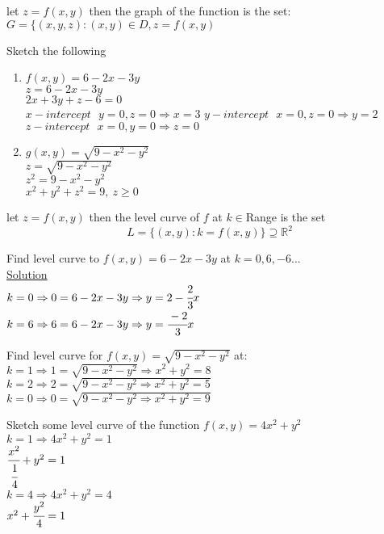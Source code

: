 \begin{definition}
let $z=f(x,y)$ then the graph of the function is the set:\\
$G=\{(x,y,z):(x,y)\in D,z=f(x,y)$
\end{definition}
\begin{example}
Sketch the following 
\begin{enumerate}
    \item $f(x,y)=6-2x-3y$\\
    $z=6-2x-3y$\\
    $2x+3y+z-6=0$\\
    $x-intercept~~~y=0,z=0\Rightarrow x=3$
    $y-intercept~~~x=0,z=0\Rightarrow y=2$
    $z-intercept~~~x=0,y=0\Rightarrow z=0$
    \item $g(x,y)=\sqrt{9-x^2-y^2}$\\
    $z=\sqrt{9-x^2-y^2}$\\
    $z^2=9-x^2-y^2$\\
    $x^2+y^2+z^2=9,~z\geq0$
\end{enumerate}
\end{example}
\noindent{\color{smalt(darkpowderblue)}\rule{\linewidth}{.2mm}}
\begin{definition}
let $z=f(x,y)$ then the level curve of $f$ at $k\in $Range is the set 
$$L=\{(x,y):k=f(x,y)\}\supseteq\mathbb{R}^2$$
\end{definition}
\begin{example}
Find level curve to $f(x,y)=6-2x-3y$ at $k=0,6,-6...$\\
\underline{\textbf{\large}\color{smalt(darkpowderblue)}Solution}\\
 $k=0\Rightarrow 0=6-2x-3y\Rightarrow y=2-\cfrac{2}{3}x$\\
$k=6\Rightarrow 6=6-2x-3y\Rightarrow y=\cfrac{-2}{3}x$
\end{example}
\noindent{\color{smalt(darkpowderblue)}\rule{\linewidth}{.2mm}}
\begin{example}
Find level curve for $f(x,y)=\sqrt{9-x^2-y^2}$ at:\\ $k=1\Rightarrow1=\sqrt{9-x^2-y^2}\Rightarrow x^2+y^2=8$\\
$k=2\Rightarrow 2=\sqrt{9-x^2-y^2\Rightarrow x^2+y^2=5}$\\
$k=0\Rightarrow 0=\sqrt{9-x^2-y^2\Rightarrow x^2+y^2=9}$
\end{example}
\noindent{\color{smalt(darkpowderblue)}\rule{\linewidth}{.2mm}}
\begin{example}
Sketch some level curve of the function $f(x,y)=4x^2+y^2$\\
$k=1\Rightarrow 4x^2+y^2=1$\\
$\cfrac{x^2}{\cfrac{1}{4}}+y^2=1$\\
$k=4\Rightarrow 4x^2+y^2=4$\\
$x^2+\cfrac{y^2}{4}=1$
\end{example}
